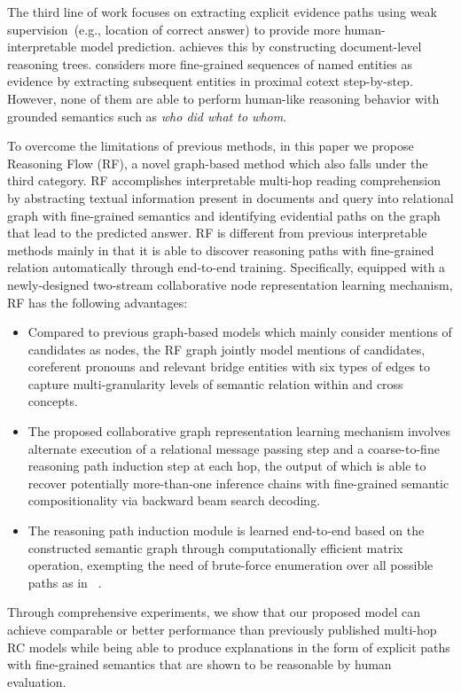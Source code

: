 The third line of work focuses on extracting explicit evidence 
paths using weak supervision~(e.g., location of correct answer) 
to provide more human-interpretable model prediction. \citet{Chen2019} achieves this by constructing document-level reasoning trees. \citet{Kundu2019} considers more fine-grained sequences of named entities as evidence by extracting subsequent entities in proximal cotext step-by-step. However, none of them 
are able to perform human-like reasoning behavior with grounded 
semantics such as \textit{who did what to whom}.

To overcome the limitations of previous methods, in this paper we propose Reasoning Flow (RF), a novel graph-based method which also falls under the third category. 
RF accomplishes interpretable multi-hop reading comprehension by abstracting textual 
information present in documents and query into relational graph with fine-grained semantics and identifying evidential paths on the graph that lead to the predicted answer.
RF is different from previous interpretable methods mainly in that it is able to 
discover reasoning paths with fine-grained relation 
automatically through end-to-end training.
Specifically, equipped with a newly-designed two-stream collaborative node representation 
learning mechanism, RF has the following advantages:
\begin{itemize}
    \item Compared to previous graph-based models which mainly consider mentions of candidates as nodes, 
the RF graph jointly model mentions of candidates, coreferent pronouns and relevant bridge entities 
with six types of edges to capture multi-granularity levels of semantic relation 
within and cross concepts.
    \item The proposed collaborative graph representation learning mechanism involves alternate 
execution of a relational message passing step and a coarse-to-fine reasoning path 
induction step at each hop, the output of which is able to recover potentially 
more-than-one inference chains with fine-grained semantic compositionality 
via backward beam search decoding.
    \item The reasoning path induction module is learned end-to-end 
based on the constructed semantic graph through computationally efficient matrix operation, 
exempting the need of brute-force enumeration over all possible paths as in ~\cite{Kundu2019}.
\end{itemize}  

Through comprehensive experiments, we show that our proposed model can 
achieve comparable or better performance than previously published multi-hop RC models 
while being able to produce explanations in the form of explicit paths 
with fine-grained semantics that are shown to be reasonable by human evaluation. 
